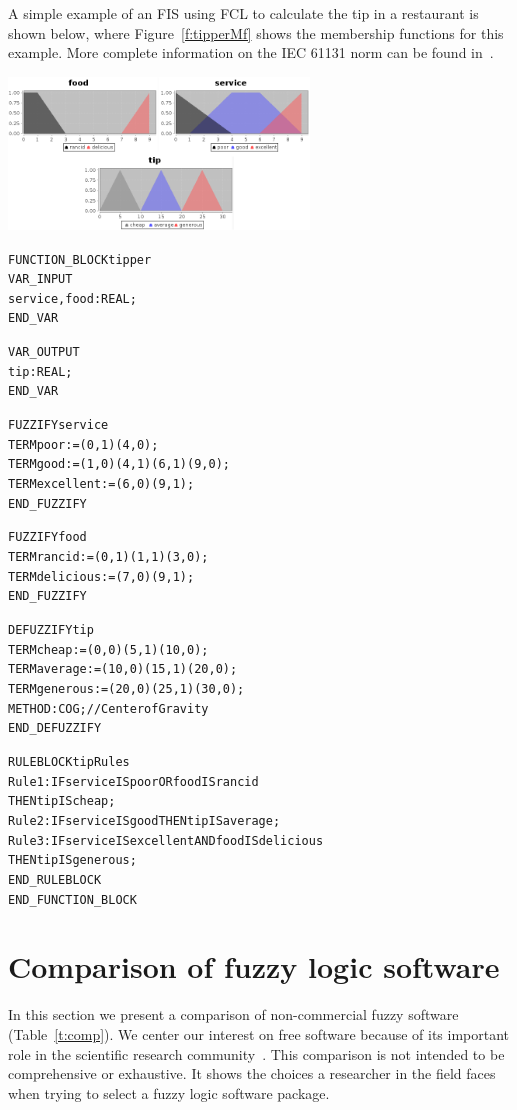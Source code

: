 \documentclass[11pt,twoside]{article}
\begin{document}
\begin{multicols}{2}
A simple example of an FIS using FCL to calculate the tip in a restaurant is shown below, where Figure~\ref{f:tipperMf} shows the membership functions for this example. More complete information on the IEC 61131 norm can be found in~\cite{IEC}.

\vspace*{10pt}
\centerline{\includegraphics[width=3.15in]{./figs/tipper_MF.png}}
\vspace*{5pt}
\label{f:tipperMf}
\vspace*{10pt}

\begin{scriptsize}
\begin{alltt}
FUNCTION\_BLOCK tipper
VAR\_INPUT
	service, food : REAL;
END\_VAR

VAR\_OUTPUT
	tip : REAL;
END\_VAR

FUZZIFY service
	TERM poor := (0, 1) (4, 0) ;
	TERM good := (1, 0) (4,1) (6,1) (9,0);
	TERM excellent := (6, 0) (9, 1);
END\_FUZZIFY

FUZZIFY food
	TERM rancid := (0, 1) (1, 1) (3,0);
	TERM delicious := (7,0) (9,1);
END\_FUZZIFY

DEFUZZIFY tip
	TERM cheap := (0,0) (5,1) (10,0);
	TERM average := (10,0) (15,1) (20,0);
	TERM generous := (20,0) (25,1) (30,0);
	METHOD : COG;			// Center of Gravity
END\_DEFUZZIFY

RULEBLOCK tipRules
	Rule1:	IF service IS poor OR food IS rancid 
       THEN tip IS cheap;
	Rule2:	IF service IS good THEN tip IS average;
	Rule3:	IF service IS excellent AND food IS delicious 
       THEN tip IS generous;
END\_RULEBLOCK
END\_FUNCTION\_BLOCK
\end{alltt}
\end{scriptsize}


\section{Comparison of fuzzy logic software}
\label{sec:stu}

In this section we present a comparison of non-commercial fuzzy software (Table~\ref{t:comp}). We center our interest on free software because of its important role in the scientific research community~\cite{Sonnenburg07}. This comparison is not intended to be comprehensive or exhaustive. It shows the choices a researcher in the field faces when trying to select a fuzzy logic software package.


\end{multicols}
\end{document}
